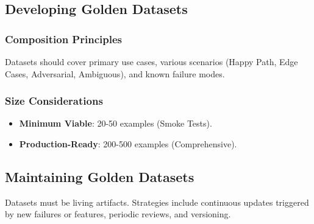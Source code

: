 \begin{TNtwocol}
\subsection{Developing Golden Datasets}
\subsubsection{Composition Principles}
Datasets should cover primary use cases, various scenarios (Happy Path, Edge Cases, Adversarial, Ambiguous), and known failure modes.
\subsubsection{Size Considerations}
\begin{itemize}
    \item \textbf{Minimum Viable}: 20-50 examples (Smoke Tests).
    \item \textbf{Production-Ready}: 200-500 examples (Comprehensive).
\end{itemize}

\subsection{Maintaining Golden Datasets}
Datasets must be living artifacts. Strategies include continuous updates triggered by new failures or features, periodic reviews, and versioning.
\end{TNtwocol}
